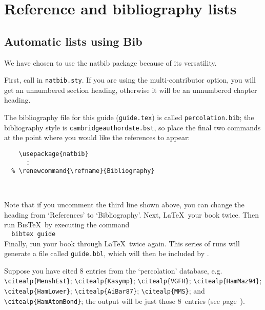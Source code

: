 
\chapter{Reference and bibliography lists}

\section{Automatic lists using Bib\TeXinsectionhead}

We have chosen to use the natbib package because of its versatility.

First, call in \texttt{natbib.sty}. If you are using the multi-contributor option, you will get an unnumbered section heading, otherwise it will be an unnumbered chapter heading.

The bibliography file for this guide (\texttt{\cambridge guide.tex}) is called \texttt{percolation.bib}; the bibliography style is \texttt{cambridgeauthordate.bst}, so place the final two commands at the point where you would like the references to appear:
%
\begin{verbatim}
    \usepackage{natbib}
      :
  % \renewcommand{\refname}{Bibliography}
    
    
\end{verbatim}
%
Note that if you uncomment the third line shown above, you can change the heading from `References' to `Bibliography'. Next, \LaTeX\ your book twice. Then run \textsc{Bib}\TeX\ by executing the command\\[0.5\baselineskip]
\verb"  bibtex "\texttt{\cambridge guide}\\[0.5\baselineskip]
Finally, run your book through \LaTeX\ twice again. This series of runs will generate a file called \texttt{\cambridge guide.bbl}, which will then be included by \verb"".

Suppose you have cited 8 entries from the `percolation' database, e.g. \verb"\citealp{MenshEst}"; \verb"\citealp{Kasymp}"; \verb"\citealp{VGFH}"; \verb"\citealp{HamMaz94}"; \verb"\citealp{HamLower}"; \verb"\citealp{AiBar87}"; \verb"\citealp{MMS}"; and \verb"\citealp{HamAtomBond}"; the output will be just those 8~entries (see page~\pageref{refs}).%
\nocite{MenshEst}\nocite{Kasymp}\nocite{VGFH}\nocite{HamMaz94}\nocite{HamLower}\nocite{AiBar87}\nocite{MMS}\nocite{HamAtomBond}

